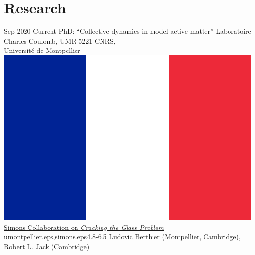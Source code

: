 \documentclass[letterpaper]{cvtemplate_en} %
\begin{document}
\makeprofile %


\vspace{\parskip}
\section{Research}

\begin{cvbody}

\cvitem
	{Sep 2020}
	{Current}
  {PhD: ``Collective dynamics in model active matter''}
  {Laboratoire Charles Coulomb, UMR 5221 CNRS,\\ Universit\'e de Montpellier \includegraphics[height=0.8\myheight]{fr}\\
  \href{https://scglass.uchicago.edu}{Simons Collaboration on \textit{Cracking the Glass Problem}}}
  {umontpellier.eps,simons.eps}{4.8}{-6.5}
	{Ludovic Berthier (Montpellier, Cambridge),\\ Robert L. Jack (Cambridge)}
  {\\}


\end{cvbody}
\end{document}
